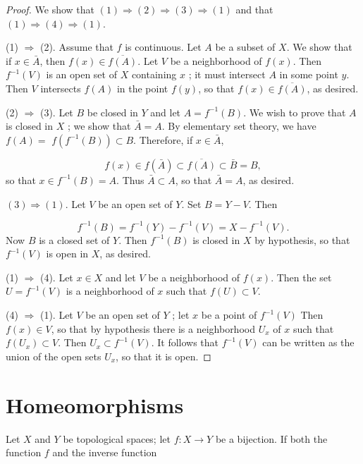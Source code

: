 \begin{proof}
 We show that \((1) \Rightarrow (2) \Rightarrow ( 3) \Rightarrow (1)\) and that \((1) \Rightarrow ( 4) \Rightarrow (1)\).

 (1) \(\Rightarrow\) (2). Assume that \(f\) is continuous. Let \(A\) be a subset of \(X\). We show that if \(x \in \bar{A}\), then \(f(x) \in \overline{f( A) }\). Let \(V\) be a neighborhood of \(f(x)\). Then \(f^{-1}( V)\) is an open set of \(X\) containing \(x\) ; it must intersect \(A\) in some point \(y\). Then \(V\) intersects \(f( A)\) in the point \(f( y)\), so that \(f(x) \in \overline{f( A) }\), as desired.

 (2) \(\Rightarrow\) (3). Let \(B\) be closed in \(Y\) and let \(A = f^{-1}( B)\). We wish to prove that \(A\) is closed in \(X\) ; we show that \(\bar{A} = A\). By elementary set theory, we have \(f( A) =\) \(f( {f^{-1}( B) }) \subset B\). Therefore, if \(x \in \bar{A}\),

 \[
 f(x) \in f( \bar{A}) \subset \overline{f( A) } \subset \bar{B} = B,
 \]
 so that \(x \in {f}^{-1}( B) = A\). Thus \(\bar{A} \subset A\), so that \(\bar{A} = A\), as desired.

 \(( 3) \Rightarrow (1)\). Let \(V\) be an open set of \(Y\). Set \(B = Y - V\). Then

 \[
 f^{-1}( B) = f^{-1}( Y) - f^{-1}( V) = X - f^{-1}( V).
 \]
 Now \(B\) is a closed set of \(Y\). Then \(f^{-1}( B)\) is closed in \(X\) by hypothesis, so that \(f^{-1}( V)\) is open in \(X\), as desired.

 (1) \(\Rightarrow\) (4). Let \(x \in X\) and let \(V\) be a neighborhood of \(f(x)\). Then the set \(U = f^{-1}( V)\) is a neighborhood of \(x\) such that \(f( U) \subset V\).

 (4) \(\Rightarrow\) (1). Let \(V\) be an open set of \(Y\) ; let \(x\) be a point of \(f^{-1}( V)\) Then \(f(x) \in V\), so that by hypothesis there is a neighborhood \(U_{x}\) of \(x\) such that \(f( U_{x}) \subset V\). Then \(U_{x} \subset {f}^{-1}( V)\). It follows that \(f^{-1}( V)\) can be written as the union of the open sets \(U_{x}\), so that it is open.
\end{proof}

\section*{Homeomorphisms}

Let \(X\) and \(Y\) be topological spaces; let \(f : X \rightarrow Y\) be a bijection. If both the function \(f\) and the inverse function

